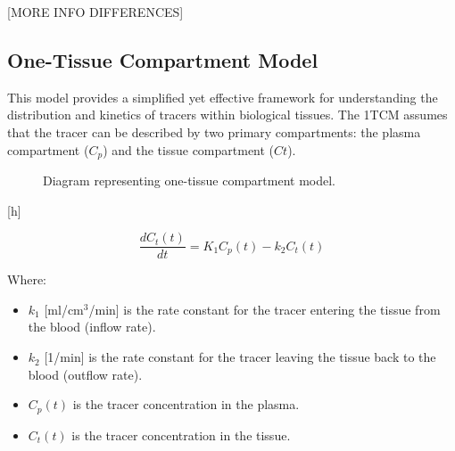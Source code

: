 [MORE INFO DIFFERENCES]

\subsection{One-Tissue Compartment Model}

This model provides a simplified yet effective framework for understanding the distribution and kinetics of tracers within biological tissues. The 1TCM assumes that the tracer can be described by two primary compartments: the plasma compartment ($C_p$) and the tissue compartment ($Ct$).

\begin{figure} [h]
\begin{center}
\end{center}
\caption{Diagram representing one-tissue compartment model.}
\end{figure}[h]

\begin{equation}
\frac{dC_t(t)}{dt} = K_1 C_p(t) - k_2 C_t(t)
\end{equation}

Where:
\begin{itemize}
    \item $k_1$ [ml/cm$^3$/min] is the rate constant for the tracer entering the tissue from the blood (inflow rate).
    \item $k_2$ [1/min] is the rate constant for the tracer leaving the tissue back to the blood (outflow rate).
    \item $C_p(t)$ is the tracer concentration in the plasma.
    \item $C_t(t)$ is the tracer concentration in the tissue.
\end{itemize}

